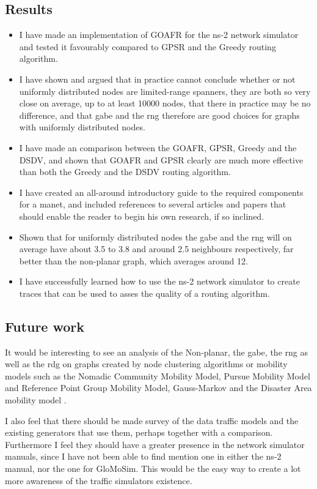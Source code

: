 \subsection{Results}
\begin{itemize}
\item I have made an implementation of GOAFR for the ns-2 network simulator and tested it favourably compared to GPSR and the Greedy routing algorithm.
\item I have shown and argued that in practice cannot conclude whether or not uniformly distributed nodes are limited-range spanners, they are both so very close on average, up to at least 10000 nodes, that there in practice may be no difference, and that \ac{gabe} and the \ac{rng} therefore are good choices for graphs with uniformly distributed nodes.
\item I have made an comparison between the GOAFR, GPSR, Greedy and the DSDV, and shown that GOAFR  and GPSR clearly are much more effective than both the Greedy and the DSDV routing algorithm.
\item I have created an all-around introductory guide to the required components for a \ac{manet}, and included references to several articles and papers that should enable the reader to begin his own research, if so inclined.
\item Shown that for uniformly distributed nodes the \ac{gabe} and the \ac{rng} will on average have about 3.5 to 3.8 and around 2.5 neighbours respectively, far better than the non-planar graph, which averages around 12.
\item I have successfully learned how to use the ns-2 network simulator to create traces that can be used to asses the quality of a routing algorithm.
\end{itemize}

\subsection{Future work}
\label{section:future_work}
It would be interesting to see an analysis of the Non-planar, the \ac{gabe}, the \ac{rng} as well as the \ac{rdg} on graphs created by node clustering algorithms or mobility models such as the  Nomadic Community Mobility Model, Pursue Mobility Model and Reference Point Group Mobility Model, Gauss-Markov \cite{MobilityAdHocResearch} and the Disaster Area mobility model \cite{disasterArea}.

I also feel that there should be made survey of the data traffic models and the existing generators that use them, perhaps together with a comparison. Furthermore I feel they should have a greater presence in the network simulator manuals, since I have not been able to find mention one in either the ns-2 manual, nor the one for GloMoSim. This would be the easy way to create a lot more awareness of the traffic simulators existence.

